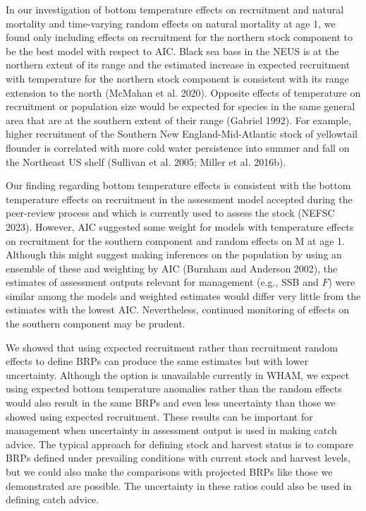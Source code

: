\documentclass[
]{article}
\begin{document}
In our investigation of bottom temperature effects on recruitment and natural mortality and time-varying random effects on natural mortality at age 1, we found only including effects on recruitment for the northern stock component to be the best model with respect to AIC. Black sea bass in the NEUS is at the northern extent of its range and the estimated increase in expected recruitment with temperature for the northern stock component is consistent with its range extension to the north (McMahan et al. 2020). Opposite effects of temperature on recruitment or population size would be expected for species in the same general area that are at the southern extent of their range (Gabriel 1992). For example, higher recruitment of the Southern New England-Mid-Atlantic stock of yellowtail flounder is correlated with more cold water persistence into summer and fall on the Northeast US shelf (Sullivan et al. 2005; Miller et al. 2016b).

Our finding regarding bottom temperature effects is consistent with the bottom temperature effects on recruitment in the assessment model accepted during the peer-review process and which is currently used to assess the stock (NEFSC 2023). However, AIC suggested some weight for models with temperature effects on recruitment for the southern component and random effects on M at age 1. Although this might suggest making inferences on the population by using an ensemble of these and weighting by AIC (Burnham and Anderson 2002), the estimates of assessment outputs relevant for management (e.g., SSB and \(F\)) were similar among the models and weighted estimates would differ very little from the estimates with the lowest AIC. Nevertheless, continued monitoring of effects on the southern component may be prudent.

We showed that using expected recruitment rather than recruitment random effects to define BRPs can produce the same estimates but with lower uncertainty. Although the option is unavailable currently in WHAM, we expect using expected bottom temperature anomalies rather than the random effects would also result in the same BRPs and even less uncertainty than those we showed using expected recruitment. These results can be important for management when uncertainty in assessment output is used in making catch advice. The typical approach for defining stock and harvest status is to compare BRPs defined under prevailing conditions with current stock and harvest levels, but we could also make the comparisons with projected BRPs like those we demonstrated are possible. The uncertainty in these ratios could also be used in defining catch advice.
\end{document}
